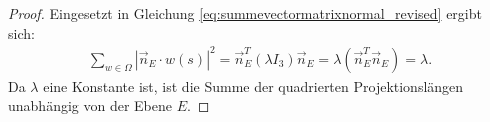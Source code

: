 \begin{proof}
    Eingesetzt in Gleichung \eqref{eq:summevectormatrixnormal_revised} ergibt sich:
    \begin{align}
        \sum_{w \in \Omega} |\vec{n}_E \cdot w(s)|^2 = \vec{n}_E^T (\lambda I_3) \vec{n}_E = \lambda (\vec{n}_E^T \vec{n}_E) = \lambda. \nonumber
    \end{align}
    Da $\lambda$ eine Konstante ist, ist die Summe der quadrierten Projektionslängen unabhängig von der Ebene $E$.
\end{proof}



